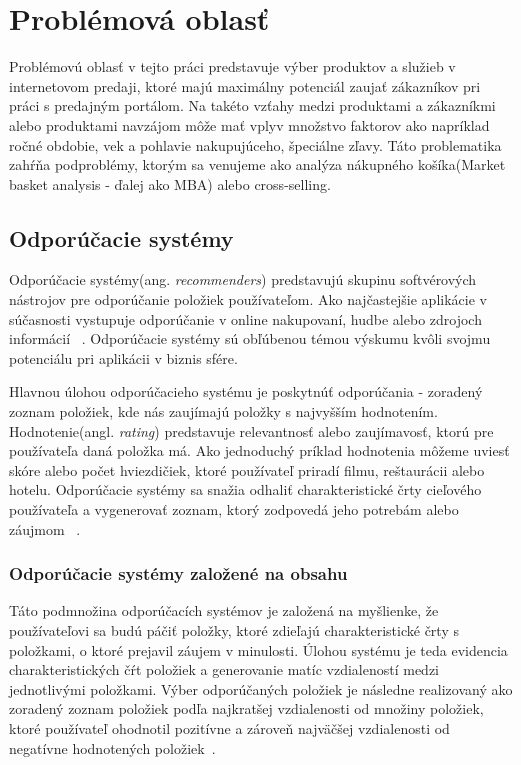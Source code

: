 \newpage


\chapter{Problémová oblasť}
\label{analyza_problemova_oblast}

Problémovú oblasť v tejto práci predstavuje výber produktov a služieb v internetovom predaji, ktoré majú maximálny potenciál zaujať zákazníkov pri práci s predajným portálom. Na takéto vzťahy medzi produktami a zákazníkmi alebo produktami navzájom môže mať vplyv množstvo faktorov ako napríklad ročné obdobie, vek a pohlavie nakupujúceho, špeciálne zľavy.
Táto problematika zahŕňa podproblémy, ktorým sa venujeme ako analýza nákupného košíka(Market basket analysis - ďalej ako MBA) alebo cross-selling.
 \newline

\section{Odporúčacie systémy}
\label{odporucacie_systemy}

Odporúčacie systémy(ang. \textit{recommenders}) predstavujú skupinu softvérových nástrojov pre odporúčanie položiek používateľom. Ako najčastejšie aplikácie v súčasnosti vystupuje odporúčanie v online nakupovaní, hudbe alebo zdrojoch informácií ~\cite{ricci2011introduction}. Odporúčacie systémy sú obľúbenou témou výskumu kvôli svojmu potenciálu pri aplikácii v biznis sfére.

Hlavnou úlohou odporúčacieho systému je poskytnúť odporúčania - zoradený zoznam položiek, kde nás zaujímajú položky s najvyšším hodnotením. Hodnotenie(angl. \textit{rating}) predstavuje relevantnosť alebo zaujímavosť, ktorú pre používateľa daná položka má. Ako jednoduchý príklad hodnotenia môžeme uviesť skóre alebo počet hviezdičiek, ktoré používateľ priradí filmu, reštaurácii alebo hotelu. Odporúčacie systémy sa snažia odhaliť charakteristické črty cieľového používateľa a vygenerovať zoznam, ktorý zodpovedá jeho potrebám alebo záujmom ~\cite{adomavicius2005toward}.

\subsection{Odporúčacie systémy založené na obsahu}
\label{content_based_recommenders}

Táto podmnožina odporúčacích systémov je založená na myšlienke, že používateľovi sa budú páčiť položky, ktoré zdieľajú charakteristické črty s položkami, o ktoré prejavil záujem v minulosti. Úlohou systému je teda evidencia charakteristických čŕt položiek a generovanie matíc vzdialeností medzi jednotlivými položkami. Výber odporúčaných položiek je následne realizovaný ako zoradený zoznam položiek podľa najkratšej vzdialenosti od množiny položiek, ktoré používateľ ohodnotil pozitívne a zároveň najväčšej vzdialenosti od negatívne hodnotených položiek~\cite{adomavicius2005toward}.


